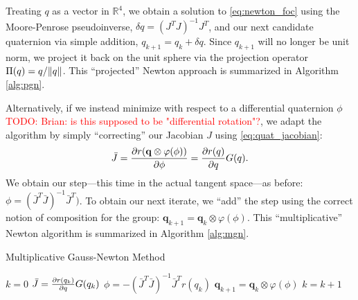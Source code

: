 \documentclass[letterpaper, 10 pt, conference]{ieeeconf}  %
\newcommand{\R}{\mathbb{R}}
\newcommand{\q}{\textbf{q}}
\newcommand{\todo}[1]{\textcolor{red}{TODO: #1}}
\begin{document}
    Treating $q$ as a vector in $\R^4$, we obtain a solution to \eqref{eq:newton_foc}
    using the Moore-Penrose pseudoinverse, $\delta q = (J^T J)^{-1} J^T$, and our
    next candidate quaternion via simple addition, $q_{k+1} = q_k + \delta q$. Since
    $q_{k+1}$ will no longer be unit norm, we project it back on the unit sphere via
    the projection operator $\Pi(q) = q / \norm{q}$. This ``projected'' Newton approach
    is summarized in Algorithm \ref{alg:pgn}.

    
    Alternatively, if we instead minimize with respect to a differential quaternion $\phi$ \todo{Brian: is this supposed to be "differential rotation"?},
    we adapt the algorithm by simply ``correcting'' our Jacobian $J$ using 
    \eqref{eq:quat_jacobian}:
    \begin{equation} 
        \bar{J} = \pdv{r(\mathbf{q} \otimes \varphi(\phi))}{\phi} = \pdv{r(q)}{q} G(q).
    \end{equation}
    We obtain our step---this time in the actual tangent space---as before:
    $\phi = (\bar{J}^T \bar{J})^{-1} \bar{J}^T)$. To obtain our next iterate, we ``add'' the
    step using the correct notion of composition for the group: 
    $\q_{k+1} = \q_k \otimes \varphi(\phi)$. This ``multiplicative'' Newton algorithm is 
    summarized in Algorithm \ref{alg:mgn}.

    \begin{algorithm} 
    	\begin{algorithmic}[1]
    		\caption{Multiplicative Gauss-Newton Method}\label{alg:mgn}
    		\State $k = 0$
    		    \State $\bar{J} = \pdv{r(q_k)}{q} G(q_k)$ 
    		    \State $ \phi = -(\bar{J}^T \bar{J})^{-1} \bar{J}^T r(q_k)$ 
    		    \State $\q_{k+1} = \q_k \otimes \varphi(\phi)$ 
    		    \State $k = k + 1$
    		\EndWhile
    	\end{algorithmic}
    \end{algorithm}
\end{document}

